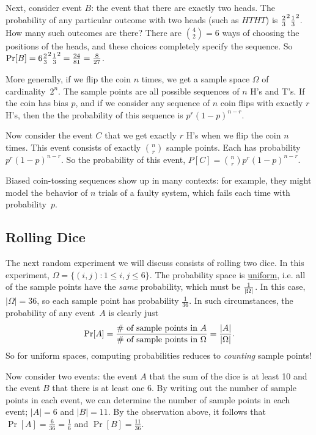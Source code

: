 \documentclass[11pt,fleqn]{article}
\begin{document}
Next, consider event $B$: the event that there are exactly two heads. The probability
of any particular outcome with two heads (such as $HTHT$) is ${2\over 3}^2 {1\over 3}^2$. 
How many such outcomes are there? There are ${4\choose 2}=6$
ways of choosing the positions of the heads, and these choices
completely specify the sequence.  So $\Pr[B]=6{2\over 3}^2 {1\over 3}^2 = {24\over{81}}= {8\over{27}}$. 

More generally, if we flip the coin $n$ times, 
we get a sample space $\Omega$ of cardinality~$2^n$. The sample points are all possible sequences of $n$ H's and T's. 
If the coin has bias $p$, and if we consider any sequence of $n$ coin flips with exactly $r$ H's,
then the the probability of this sequence is $p^r(1-p)^{n-r}$. 

Now consider the event $C$ that we get exactly $r$ H's when we flip the coin $n$ times. 
This event consists of exactly ${n \choose r}$ sample points. Each has probability $p^r(1-p)^{n-r}$.
So the probability of this event, $P[C] = {n \choose r}p^r(1-p)^{n-r}$.

Biased coin-tossing sequences show up in many contexts:
for example, they might model the behavior of $n$ trials of a faulty system,
which fails each time with probability~$p$.

\subsection*{Rolling Dice}

The next random experiment we will discuss consists of rolling two dice.
In this experiment, 
$\Omega=\{(i,j):1\le i,j\le 6\}$.  The probability space is \underline{uniform}, i.e.
all of the sample points have the {\it same\/} probability, which must be $1\over{|\Omega|}$.
In this case, $|\Omega| = 36$, so each sample point has probability $\frac{1}{36}$.
In such circumstances, the
probability of any event~$A$ is clearly just$$
\Pr[A] = { \hbox{\rm \# of sample points in $A$} \over
\hbox{\rm \# of sample points in $\Omega$} }
= {{|A|}\over{|\Omega|}}.  $$
So for uniform spaces, computing probabilities reduces to
{\it counting\/} sample points!

Now consider two events: the event $A$ that the sum of the dice is at least 10
and the event $B$ that there is at least one 6. By writing out the number of sample points
in each event, we can determine the number of sample points in each event; $|A| = 6$ and $|B| = 11$.
By the observation above, it follows that $\Pr[A] = \frac{6}{36} = \frac{1}{6}$ and $\Pr[B] = \frac{11}{36}$. 
\end{document}
